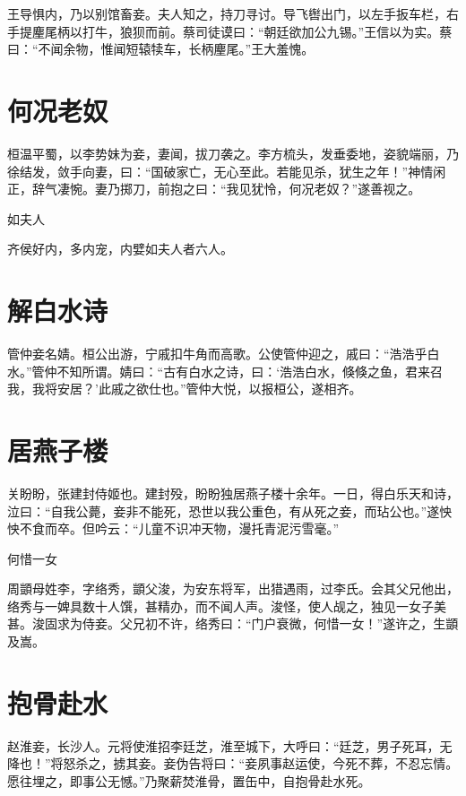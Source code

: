 \documentclass[a4paper,12pt,UTF8,twoside]{ctexbook}
\begin{document}
    王导惧内，乃以别馆畜妾。夫人知之，持刀寻讨。导飞辔出门，以左手扳车栏，右手提麈尾柄以打牛，狼狈而前。蔡司徒谟曰：“朝廷欲加公九锡。”王信以为实。蔡曰：“不闻余物，惟闻短辕犊车，长柄麈尾。”王大羞愧。
    
    \section{何况老奴}
    
    桓温平蜀，以李势妹为妾，妻闻，拔刀袭之。李方梳头，发垂委地，姿貌端丽，乃徐结发，敛手向妻，曰：“国破家亡，无心至此。若能见杀，犹生之年！”神情闲正，辞气凄惋。妻乃掷刀，前抱之曰：“我见犹怜，何况老奴？”遂善视之。
    
    如夫人
    
    齐侯好内，多内宠，内嬖如夫人者六人。
    
    \section{解白水诗}
    
    管仲妾名婧。桓公出游，宁戚扣牛角而高歌。公使管仲迎之，戚曰：“浩浩乎白水。”管仲不知所谓。婧曰：“古有白水之诗，曰：‘浩浩白水，倏倏之鱼，君来召我，我将安居？’此戚之欲仕也。”管仲大悦，以报桓公，遂相齐。
    
    \section{居燕子楼}
    
    关盼盼，张建封侍姬也。建封殁，盼盼独居燕子楼十余年。一日，得白乐天和诗，泣曰：“自我公薨，妾非不能死，恐世以我公重色，有从死之妾，而玷公也。”遂怏怏不食而卒。但吟云：“儿童不识冲天物，漫托青泥污雪毫。”
    
    何惜一女
    
    周顗母姓李，字络秀，顗父浚，为安东将军，出猎遇雨，过李氏。会其父兄他出，络秀与一婢具数十人馔，甚精办，而不闻人声。浚怪，使人觇之，独见一女子美甚。浚固求为侍妾。父兄初不许，络秀曰：“门户衰微，何惜一女！”遂许之，生顗及嵩。
    
    \section{抱骨赴水}
    
    赵淮妾，长沙人。元将使淮招李廷芝，淮至城下，大呼曰：“廷芝，男子死耳，无降也！”将怒杀之，掳其妾。妾伪告将曰：“妾夙事赵运使，今死不葬，不忍忘情。愿往埋之，即事公无憾。”乃聚薪焚淮骨，置缶中，自抱骨赴水死。
    
\end{document}
